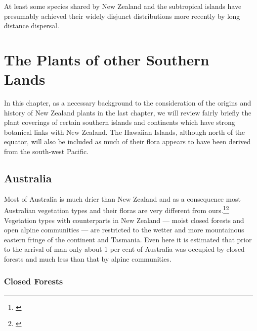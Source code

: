 At least some species shared by New Zealand and the subtropical islands have presumably achieved their widely disjunct distributions more recently by long distance dispersal.

\chapter{The Plants of other Southern Lands}

In this chapter, as a necessary background to the consideration of the origins and history of New Zealand plants in the last chapter, we will review fairly briefly the plant coverings of certain southern islands and continents which have strong botanical links with New Zealand.
The Hawaiian Islands, although north of the equator, will also be included as much of their flora appears to have been derived from the south-west Pacific.

\section{Australia}

Most of Australia is much drier than New Zealand and as a consequence most Australian vegetation types and their floras are very different from ours.\footnote{\cite{beadle1981vegetation}}\footnote{\cite{groves1981australian}} Vegetation types with counterparts in New Zealand — moist closed forests and open alpine communities — are restricted to the wetter and more mountainous eastern fringe of the continent and Tasmania.
Even here it is estimated that prior to the arrival of man only about 1 per cent of Australia was occupied by closed forests and much less than that by alpine communities.

\subsection{Closed Forests}

